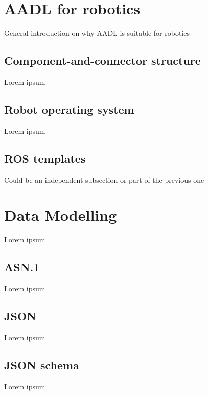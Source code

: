 \section{AADL for robotics}
General introduction on why AADL is suitable for robotics

\subsection{Component-and-connector structure}
Lorem ipsum

\subsection{Robot operating system}
Lorem ipsum

\subsection{ROS templates}
Could be an independent subsection or part of the previous one

\section{Data Modelling}
Lorem ipsum

\subsection{ASN.1}
Lorem ipsum

\subsection{JSON}
Lorem ipsum

\subsection{JSON schema}
Lorem ipsum

